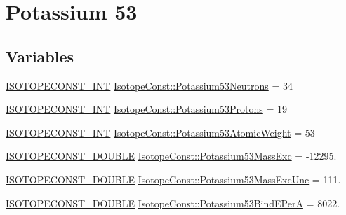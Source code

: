 \hypertarget{group___isotope_const-_potassium-_k53}{}\section{Potassium 53}
\label{group___isotope_const-_potassium-_k53}
\subsection*{Variables}
\begin{DoxyCompactItemize}
\item 
\mbox{\hyperlink{group___isotope_const-_macros_ga5f18360b3e99483a35c32d789e62621c}{I\+S\+O\+T\+O\+P\+E\+C\+O\+N\+S\+T\+\_\+\+I\+NT}} \mbox{\hyperlink{group___isotope_const-_potassium-_k53_ga0f520ad60c020a23c2a04fa7cc415c54}{Isotope\+Const\+::\+Potassium53\+Neutrons}} = 34
\item 
\mbox{\hyperlink{group___isotope_const-_macros_ga5f18360b3e99483a35c32d789e62621c}{I\+S\+O\+T\+O\+P\+E\+C\+O\+N\+S\+T\+\_\+\+I\+NT}} \mbox{\hyperlink{group___isotope_const-_potassium-_k53_gadd5eff034d46a471de435ec6a00eb1cc}{Isotope\+Const\+::\+Potassium53\+Protons}} = 19
\item 
\mbox{\hyperlink{group___isotope_const-_macros_ga5f18360b3e99483a35c32d789e62621c}{I\+S\+O\+T\+O\+P\+E\+C\+O\+N\+S\+T\+\_\+\+I\+NT}} \mbox{\hyperlink{group___isotope_const-_potassium-_k53_ga1bba36a9609a26e6d2e973e8710ff3fb}{Isotope\+Const\+::\+Potassium53\+Atomic\+Weight}} = 53
\item 
\mbox{\hyperlink{group___isotope_const-_macros_ga8f45a7272ce02c0b4c65c44636ed719a}{I\+S\+O\+T\+O\+P\+E\+C\+O\+N\+S\+T\+\_\+\+D\+O\+U\+B\+LE}} \mbox{\hyperlink{group___isotope_const-_potassium-_k53_ga40974d2579e42d3dc86b435949beae28}{Isotope\+Const\+::\+Potassium53\+Mass\+Exc}} = -\/12295.
\item 
\mbox{\hyperlink{group___isotope_const-_macros_ga8f45a7272ce02c0b4c65c44636ed719a}{I\+S\+O\+T\+O\+P\+E\+C\+O\+N\+S\+T\+\_\+\+D\+O\+U\+B\+LE}} \mbox{\hyperlink{group___isotope_const-_potassium-_k53_ga214d757c81f565f31485ef38189cfa0a}{Isotope\+Const\+::\+Potassium53\+Mass\+Exc\+Unc}} = 111.
\item 
\mbox{\hyperlink{group___isotope_const-_macros_ga8f45a7272ce02c0b4c65c44636ed719a}{I\+S\+O\+T\+O\+P\+E\+C\+O\+N\+S\+T\+\_\+\+D\+O\+U\+B\+LE}} \mbox{\hyperlink{group___isotope_const-_potassium-_k53_ga822569615552201d1e3c2e48bad92420}{Isotope\+Const\+::\+Potassium53\+Bind\+E\+PerA}} = 8022.
\item 

\end{DoxyCompactItemize}
